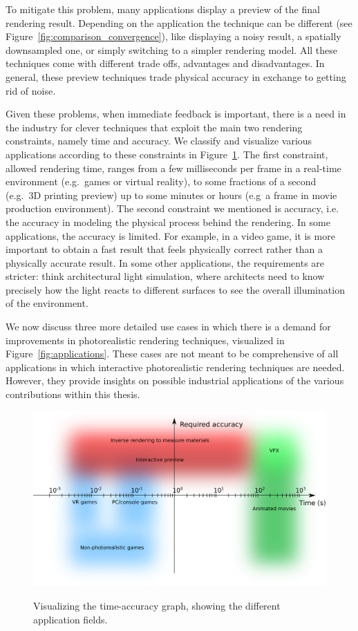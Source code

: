 To mitigate this problem, many applications display a preview of the final rendering result. Depending on the application the technique can be different (see Figure~\ref{fig:comparison_convergence}), like displaying a noisy result, a spatially downsampled one, or simply switching to a simpler rendering model. All these techniques come with different trade offs, advantages and disadvantages. In general, these preview techniques trade physical accuracy in exchange to getting rid of noise. 

Given these problems, when immediate feedback is important, there is a need in the industry for clever techniques that exploit the main two rendering constraints, namely time and accuracy. We classify and visualize various applications according to these constraints in Figure~\ref{fig:main_diagram}. The first constraint, allowed rendering time, ranges from a few milliseconds per frame in a real-time environment (e.g.\ games or virtual reality), to some fractions of a second (e.g.\ 3D printing preview) up to some minutes or hours (e.g\ a frame in movie production environment). The second constraint we mentioned is accuracy, i.e. the accuracy in modeling the physical process behind the rendering. In some applications, the accuracy is  limited. For example, in a video game, it is more important to obtain a fast result that feels physically correct rather than a physically accurate result. In some other applications, the requirements are stricter: think architectural light simulation, where architects need to know precisely how the light reacts to different surfaces to see the overall illumination of the environment. 

We now discuss three more detailed use cases in which there is a demand for improvements in photorealistic rendering techniques, visualized in Figure~\ref{fig:applications}. These cases are not meant to be comprehensive of all applications in which interactive photorealistic rendering techniques are needed. However, they provide insights on possible industrial applications of the various contributions within this thesis.

\begin{figure}
\centering
	 \includegraphics[width=\textwidth]{figures/photorealistic_diagram.png}  \\
\caption{Visualizing the time-accuracy graph, showing the  different application fields.} 
\label{fig:main_diagram}
\end{figure}

